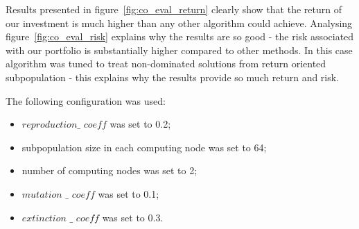 Results presented in figure~\ref{fig:co_eval_return} clearly show that the return of our investment is much higher than any other algorithm could achieve.  
Analysing figure~\ref{fig:co_eval_risk} explains why the results are so good - the risk associated with our portfolio is substantially higher compared to other methods.
In this case algorithm was tuned to treat non-dominated solutions from return oriented subpopulation - this explains why the results provide so much return and risk. 

The following configuration was used:
\begin{itemize}
  \item $reproduction\_$ $coeff$ was set to 0.2;
  \item subpopulation size in each computing node was set to 64;
  \item number of computing nodes was set to 2;
  \item $mutation$ $\_$ $coeff$ was set to 0.1;
  \item $extinction$ $\_$ $coeff$ was set to 0.3.
\end{itemize}


